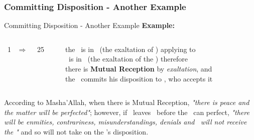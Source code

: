 \subsubsection{Committing Disposition - Another Example}
\begin{frame}[t]{Committing Disposition - Another Example}
\textbf{Example:}\footnotemark[1]
\begin{columns}[T, onlytextwidth]
\Sun\ 1 \Libra\ $\Rightarrow$ \Opposition\ \Saturn\ 25 \Aries

\rule{.1mm}{.20\textheight}

the \Sun\ is in \Libra\ (the exaltation of \Saturn) applying to \Opposition\ \Saturn \\
\Saturn\ is in \Aries\ (the exaltation of the \Sun) therefore \\
there is \textbf{Mutual Reception} by \textsl{exaltation}, and \\
the \Sun\ commits his disposition to \Saturn, who accepts it
\end{columns}
\vspace{0.25cm}
According to Masha'Allah, when there is Mutual Reception, \textsl{"there is peace and the matter will be perfected"}; however, if \Saturn\ leaves \Aries\ before the \Opposition\ can perfect, \textsl{"there will be enmities, contrariness, misunderstandings, denials and \Saturn\ will not receive the \Sun"} and so will not take on the \Sun's disposition.

\end{frame}
